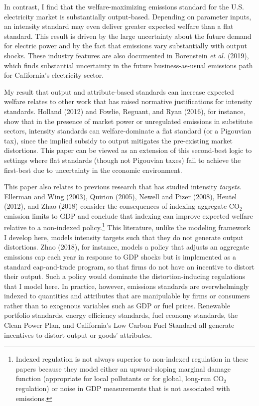 \documentclass[12pt]{article}
\begin{document}
In contrast, I find that the welfare-maximizing emissions standard for the U.S. electricity market is substantially output-based. Depending on parameter inputs, an intensity standard may even deliver greater expected welfare than a flat standard. This result is driven by the large uncertainty about the future demand for electric power and by the fact that emissions vary substantially with output shocks. These industry features are also documented in Borenstein {\it et al.} (2019), which finds substantial uncertainty in the future business-as-usual emissions path for California's electricity sector.

My result that output and attribute-based standards can increase expected welfare relates to other work that has raised normative justifications for intensity standards. Holland (2012) and Fowlie, Reguant, and Ryan (2016), for instance, show that in the presence of market power or unregulated emissions in substitute sectors, intensity standards can welfare-dominate a flat standard (or a Pigouvian tax), since the implied subsidy to output mitigates the pre-existing market distortions. This paper can be viewed as an extension of this second-best logic to settings where flat standards (though not Pigouvian taxes) fail to achieve the first-best due to uncertainty in the economic environment.

This paper also relates to previous research that has studied intensity {\it targets}. Ellerman and Wing (2003), Quirion (2005), Newell and Pizer (2008), Heutel (2012), and Zhao (2018) consider the consequences of indexing aggregate CO$_{\text{2}}$ emission limits to GDP and conclude that indexing can improve expected welfare relative to a non-indexed policy.\footnote{Indexed regulation is not always superior to non-indexed regulation in these papers because they model either an upward-sloping marginal damage function (appropriate for local pollutants or for global, long-run CO$_{\text{2}}$ regulation) or noise in GDP measurements that is not associated with emissions.} This literature, unlike the modeling framework I develop here, models intensity targets such that they do not generate output distortions. Zhao (2018), for instance, models a policy that adjusts an aggregate emissions cap each year in response to GDP shocks but is implemented as a standard cap-and-trade program, so that firms do not have an incentive to distort their output. Such a policy would dominate the distortion-inducing regulations that I model here. In practice, however, emissions standards are overwhelmingly indexed to quantities and attributes that are manipulable by firms or consumers rather than to exogenous variables such as GDP or fuel prices. Renewable portfolio standards, energy efficiency standards, fuel economy standards, the Clean Power Plan, and California's Low Carbon Fuel Standard all generate incentives to distort output or goods' attributes.
\end{document}
